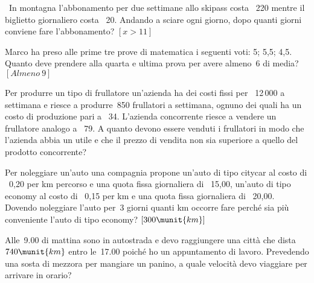 \begin{htmulticols}{2}
 \begin{esercizio}[*]
 \label{ese:21.23}
 \ In montagna l'abbonamento per due settimane allo
skipass costa \officialeuro\ 220 mentre il biglietto giornaliero costa
\officialeuro\ 20. Andando a sciare ogni giorno, dopo quanti giorni
conviene fare l'abbonamento? \hfill \(\left[x>11\right]\)
 \end{esercizio}

 \begin{esercizio}[*]
 \label{ese:21.24}
 Marco ha preso alle prime tre prove di matematica i seguenti voti: 5;
5,5; 4,5. Quanto deve prendere alla quarta e ultima prova per avere almeno~6
di media? \hfill \(\left[Almeno~9\right]\)
 \end{esercizio}

 \begin{esercizio}
 \label{ese:21.25}
 Per produrre un tipo di frullatore un'azienda ha dei
costi fissi per \officialeuro\ 12\,000 a settimana e riesce a produrre~850
frullatori a settimana, ognuno dei quali ha un costo di produzione pari
a \officialeuro\ 34. L'azienda concorrente riesce a
vendere un frullatore analogo a \officialeuro\ 79. A quanto devono essere
venduti i frullatori in modo che l'azienda abbia un
utile e che il prezzo di vendita non sia superiore a quello del
prodotto concorrente?
 \end{esercizio}

 \begin{esercizio}[*]
 \label{ese:21.26}
 Per noleggiare un'auto una compagnia propone
un'auto di tipo citycar al costo di \officialeuro\ 0,20 per km percorso e una 
quota fissa giornaliera
di \officialeuro\ 15,00,
un'auto di tipo economy al costo di \officialeuro\ 0,15
per km e una quota fissa giornaliera di \officialeuro\ 20,00. Dovendo
noleggiare l'auto per~3 giorni quanti km occorre fare
perché sia più conveniente l'auto di tipo economy?
 \hfill \(\left[300\munit{km}\right]\)
 \end{esercizio}

 \begin{esercizio}
 \label{ese:21.27}
 Alle~9.00 di mattina sono in autostrada e devo raggiungere una città
che dista~\(740\munit{km}\) entro le~17.00 poiché ho un appuntamento di lavoro.
Prevedendo una sosta di mezzora per mangiare un panino, a quale
velocità devo viaggiare per arrivare in orario?
 \end{esercizio}



\end{htmulticols}
